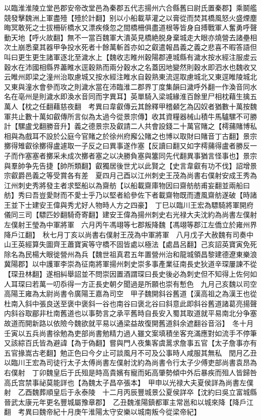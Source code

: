 以臨淮淮陵立堂邑郡安帝改堂邑為秦郡五代志揚州六合縣舊曰尉氏置秦郡】乘鬬艦競發擊魏洲上軍盡殪【殪於計翻】别以小船載草灌之以膏從而焚其橋風怒火盛煙塵晦冥敢死之士拔柵斫橋水又漂疾倏忽之間橋柵俱盡道根等皆身自搏戰軍人奮勇呼聲動天地【呼火故翻】無不一當百魏軍大潰英見橋絶脱身棄城走大眼亦燒營去諸壘相次土崩悉棄其器甲争投水死者十餘萬斬首亦如之叡遣報昌義之義之悲喜不暇答語但叫曰更生更生諸軍逐北至濊水上【魏收志睢州穀陽郡連城縣有濊水按水經注服䖍云穀水在沛國相縣界藎睢水逕穀熟而兩分穀水之名蓋因地變然則穀水即泗水也魏收又云睢州即梁之潼州治取慮城又按水經注睢水自穀熟東流逕取慮城北又東逕睢陵城北又東與潼水會參而攻之則濊水當在沛臨淮二郡界丁度集韻曰濊呼外翻一作渙音同水名在亳州是則濊水即渙水音同而字異耳】英單騎入梁城緣淮百餘里尸相枕藉生擒五萬人【枕之任翻藉慈夜翻　考異曰韋叡傳云其餘釋甲稽顙乞為囚奴者猶數十萬按魏軍共止數十萬如叡傳所言似為太過今從景宗傳】收其資糧器械山積牛馬驢騾不可勝計【騾盧戈翻勝音升】義之德景宗及叡請二人共會設錢二十萬官賭之【樗蒱賭博私相與為戲耳不設於公庭今官賭之於徐州府廨公賭之也博以取財曰賭音丁古翻】景宗擲得雉叡徐擲得盧遽取一子反之曰異事遂作塞【反讀曰翻又如字樗蒱得盧者勝反一子而作塞塞者擲采未成次擲者塞之以决勝負塞與簺同先代翻異事猶言怪事也】景宗與羣帥争先告捷【帥所類翻】叡獨居後世尤以此賢之【史言韋叡有功不伐】詔增景宗叡爵邑義之等受賞各有差　夏四月己酉以江州刺史王茂為尚書右僕射安成王秀為江州刺史秀將發主者求堅船以為齋舫【以船載齋庫物因曰齋舫舫甫妄翻並兩船曰舫】秀曰吾豈愛財而不愛士乎乃以堅者給參佐下者載齋物既而遭風齋舫遂破【時諸王並下士建安王偉與秀尤好人物時人方之四豪】　丁巳以臨川王宏為驃騎將軍開府儀同三司【驃匹妙翻騎奇寄翻】建安王偉為揚州刺史右光禄大夫沈約為尚書左僕射左僕射王瑩為中軍將軍　六月丙午馮翊等七郡叛降魏【馮翊等郡江左僑立於雍州界降戶江翻】　秋七月丁亥以尚書右僕射王茂為中軍將軍　八月戊子大赦魏有司奏中山王英經算失圖齊王蕭寶寅等守橋不固皆處以極法【處昌呂翻】己亥詔英寶寅免死除名為民楊大眼徙營州為兵【魏世祖真君五年置營州治和龍城領昌黎建德遼東樂浪冀陽郡】以中護軍李崇為征南將軍揚州刺史崇多事產業征南長史狄道辛琛屢諫不從【琛丑林翻】遂相糾舉詔並不問崇因置酒謂琛曰長史後必為刺史但不知得上佐何如人耳琛曰若萬一叨忝得一方正長史朝夕聞過是所願也崇有慙色　九月己亥魏以司空高陽王雍為太尉尚書令廣陽王嘉為司空　甲子魏開斜谷舊道【漢高祖之為漢王也從杜南入斜中張良送至褒中褒斜一谷也南谷曰褒北谷曰斜意此即斜谷舊道諸葛亮揚聲内斜谷取郿非杜南舊道也以事勢言之承平舊時自長安入蜀其取道就平易南北分争塞故道而開新路以依險今魏欲就平易以通梁益故復開舊道斜余遮翻谷音浴】　冬十月壬寅以五兵尚書徐勉為吏部尚書勉精力過人雖文案填積坐客充滿應對如流手不停筆又該綜百氏皆為避諱【為于偽翻】嘗與門人夜集客虞暠求詹事五官【太子詹事亦有五官掾嵩古老翻】勉正色曰今夕止可談風月不可及公事時人咸服其無私　閏月乙丑以臨川王宏為司徒行太子太傅尚書左僕射沈約為尚書令行太子少傅吏部尚書袁昂為右僕射　丁卯魏皇后于氏殂是時高貴嬪有寵而妬高肇勢傾中外后暴疾而殂人皆歸咎高氏宫禁事祕莫能詳也【為魏太子昌卒張本】　甲申以光禄大夫夏侯詳為尚書左僕射　乙酉魏葬順皇后于永泰陵　十二月丙辰豐城景公夏侯詳卒【沈約曰吳立富城縣晉武太康元年更名豐城屬豫章郡】　乙丑魏淮陽鎮都軍主常邕和以城來降【降戶江翻　考異曰魏帝紀十月庚午淮陽太守安樂以城南叛今從梁帝紀】

